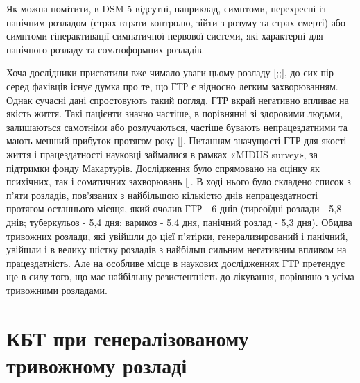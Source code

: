 \documentclass[twocolumn]{article}
\begin{document}
\par Як можна помітити, в DSM-5 відсутні, наприклад, симптоми, перехресні із панічним розладом (страх втрати контролю, зійти з розуму та страх смерті) або симптоми гіперактивації симпатичної нервової системи, які характерні для панічного розладу та соматоформних розладів.
\par Хоча дослідники присвятили вже чимало уваги цьому розладу [\cite{bib7};\cite{bib8};\cite{bib9}], до сих пір серед фахівців існує думка про те, що ГТР є відносно легким захворюванням. Однак сучасні дані спростовують такий погляд. ГТР вкрай негативно впливає на якість життя. Такі пацієнти значно частіше, в порівнянні зі здоровими людьми, залишаються самотніми або розлучаються, частіше бувають непрацездатними та мають менший прибуток протягом року [\cite{bib10}]. Питанням значущості ГТР для якості життя і працездатності науковці займалися в рамках «MIDUS survey», за підтримки фонду Макартурів. Дослідження було спрямовано на оцінку як психічних, так і соматичних захворювань [\cite{bib11}]. В ході нього було складено список з п'яти розладів, пов'язаних з найбільшою кількістю днів непрацездатності протягом останнього місяця, який очолив ГТР - 6 днів (тиреоїдні розлади - 5,8 днів; туберкульоз - 5,4 дня; варикоз - 5,4 дня, панічний розлад - 5,3 дня). Обидва тривожних розлади, які увійшли до цієї п'ятірки, генерализирований і панічний, увійшли і в велику шістку розладів з найбільш сильним негативним впливом на працездатність. Але на особливе місце в наукових дослідженнях ГТР претендує ще в силу того, що має найбільшу резистентність до лікування, порівняно з усіма тривожними розладами.
\section {КБТ при генералізованому тривожному розладі}
\end{document}
